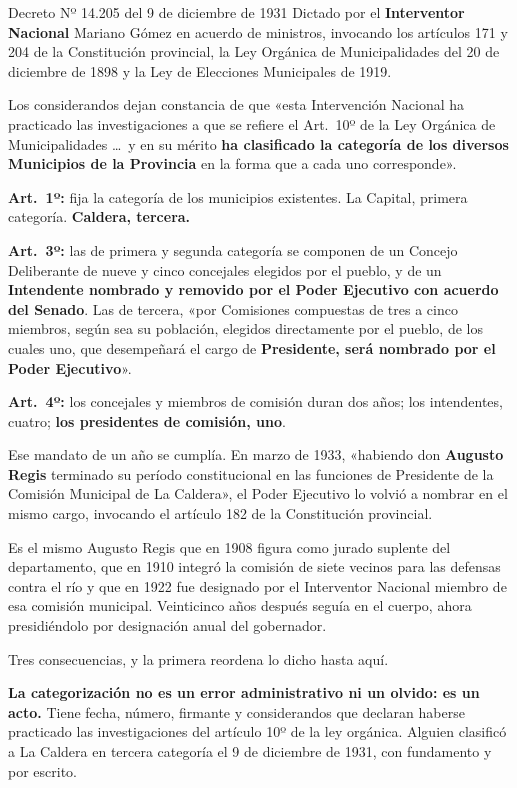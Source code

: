 \begin{ficha}{Decreto Nº 14.205 del 9 de diciembre de 1931}
Dictado por el \textbf{Interventor Nacional} Mariano Gómez en acuerdo de ministros,
invocando los artículos 171 y 204 de la Constitución provincial, la Ley Orgánica de
Municipalidades del 20 de diciembre de 1898 y la Ley de Elecciones Municipales de 1919.

Los considerandos dejan constancia de que «esta Intervención Nacional ha practicado las
investigaciones a que se refiere el Art.\ 10º de la Ley Orgánica de Municipalidades \ldots\
y en su mérito \textbf{ha clasificado la categoría de los diversos Municipios de la
Provincia} en la forma que a cada uno corresponde».

\textbf{Art.\ 1º:} fija la categoría de los municipios existentes. La Capital, primera
categoría. \textbf{Caldera, tercera.}

\textbf{Art.\ 3º:} las de primera y segunda categoría se componen de un Concejo Deliberante
de nueve y cinco concejales elegidos por el pueblo, y de un \textbf{Intendente nombrado y
removido por el Poder Ejecutivo con acuerdo del Senado}. Las de tercera, «por Comisiones
compuestas de tres a cinco miembros, según sea su población, elegidos directamente por el
pueblo, de los cuales uno, que desempeñará el cargo de \textbf{Presidente, será nombrado por
el Poder Ejecutivo}».

\textbf{Art.\ 4º:} los concejales y miembros de comisión duran dos años; los intendentes,
cuatro; \textbf{los presidentes de comisión, uno}.
\end{ficha}

Ese mandato de un año se cumplía. En marzo de 1933, «habiendo don \textbf{Augusto Regis}
terminado su período constitucional en las funciones de Presidente de la Comisión Municipal
de La Caldera», el Poder Ejecutivo lo volvió a nombrar en el mismo cargo, invocando el
artículo 182 de la Constitución provincial.

Es el mismo Augusto Regis que en 1908 figura como jurado suplente del departamento, que en
1910 integró la comisión de siete vecinos para las defensas contra el río y que en 1922 fue
designado por el Interventor Nacional miembro de esa comisión municipal. Veinticinco años
después seguía en el cuerpo, ahora presidiéndolo por designación anual del gobernador.

Tres consecuencias, y la primera reordena lo dicho hasta aquí.

\textbf{La categorización no es un error administrativo ni un olvido: es un acto.} Tiene
fecha, número, firmante y considerandos que declaran haberse practicado las investigaciones
del artículo 10º de la ley orgánica. Alguien clasificó a La Caldera en tercera categoría el
9 de diciembre de 1931, con fundamento y por escrito.

